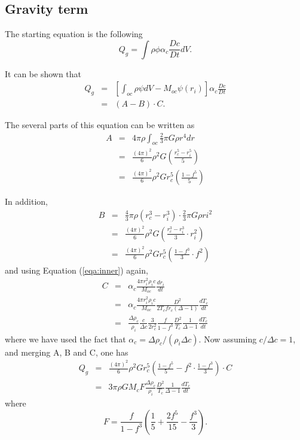 \subsection*{Gravity term}

The starting equation is the following
%
\begin{equation}
Q_g = \int \rho \phi \alpha_c \frac{Dc}{Dt} dV.
\end{equation}

It can be shown \citep[see][]{Nimmo:2007tw} that
%
\begin{eqnarray}
Q_g &=& \left[ \int_{oc} \rho \psi dV - M_{oc}\psi(r_i) \right] \alpha_c \frac{Dc}{Dt} \\
	&=& (A-B) \cdot C.
\end{eqnarray}

The several parts of this equation can be written as
%
\begin{eqnarray}
A	&=& 4\pi\rho \int_{oc} \frac{2}{3} \pi G \rho r^4 dr \nonumber \\
	&=& \frac{(4\pi)^2}{6} \rho^2 G \left( \frac{r_c^5 - r_i^5}{5} \right) \nonumber \\
	&=& \frac{(4\pi)^2}{6} \rho^2 G r_c^5 \left( \frac{1 - f^5}{5} \right)
\end{eqnarray}

In addition,
%
\begin{eqnarray}
B	&=& \frac{4}{3} \pi \rho (r_c^3 - r_i^3) \cdot \frac{2}{3} \pi G \rho ri^2 \nonumber \\
	&=& \frac{(4\pi)^2}{6} \rho^2 G \left( \frac{r_c^3-r_i^3}{3}\cdot r_i^2 \right) \nonumber \\
	&=& \frac{(4\pi)^2}{6} \rho^2 G r_c^5 \left( \frac{1 - f^3}{3}\cdot f^2 \right)
\end{eqnarray}
%
and using Equation (\ref{eqa:inner}) again,
%
\begin{eqnarray}
C	&=& \alpha_c \frac{4\pi r_i^2 \rho_i c}{M_{oc}} \frac{dr_i}{dt} \nonumber \\
	&=& \alpha_c \frac{4\pi r_i^2 \rho_i c}{M_{oc}} \frac{D^2}{2 T_c f r_c (\Delta - 1)} \frac{dT_c}{dt} \nonumber\\
	&=& \frac{\Delta \rho_c}{\rho_i} \frac{c}{\Delta c} \frac{3}{2 r_c^2} \frac{f}{1-f^3} \frac{D^2}{T_c} \frac{1}{\Delta - 1} \frac{dT_c}{dt}
\end{eqnarray}
%
where we have used the fact that $\alpha_c = \Delta \rho_c/(\rho_i \Delta c)$. Now assuming
$c/\Delta c = 1$, and merging A, B and C, one has
%
\begin{eqnarray}
Q_g &=& \frac{(4\pi)^2}{6} \rho^2 G r_c^5 \left( \frac{1-f^5}{5} - f^2 \cdot \frac{1-f^3}{3} \right) \cdot C \nonumber \\
	&=& 3 \pi \rho G M_c F \frac{\Delta \rho_c}{\rho_i}  \frac{D^2}{T_c} \frac{1}{\Delta - 1} \frac{dT_c}{dt}
\end{eqnarray}
%
where
%
\begin{equation}
F = \frac{f}{1-f^3}\left( \frac{1}{5} + \frac{2f^5}{15} - \frac{f^3}{3} \right).
\end{equation}
